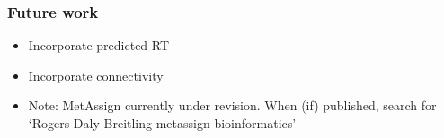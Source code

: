 \begin{frame}
	\frametitle{Future work}
	\begin{itemize}
		\item Incorporate predicted \ac{RT}
		\item<2-> Incorporate connectivity
		\item<3-> Note: MetAssign currently under revision. When (if) published, search for `Rogers Daly Breitling metassign bioinformatics'
	\end{itemize}
\end{frame}		
